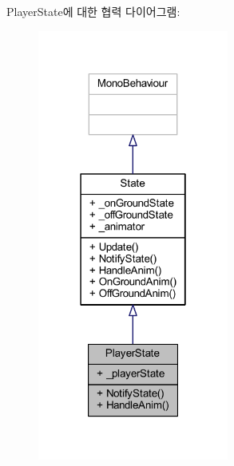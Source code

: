 Player\+State에 대한 협력 다이어그램\+:\nopagebreak
\begin{figure}[H]
\begin{center}
\leavevmode
\includegraphics[width=178pt]{df/dfa/class_player_state__coll__graph}
\end{center}
\end{figure}
